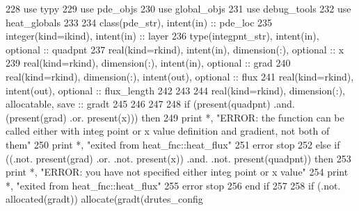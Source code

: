 \begin{DoxyCode}
228       \textcolor{keywordtype}{use }typy
229       \textcolor{keywordtype}{use }pde_objs
230       \textcolor{keywordtype}{use }global_objs
231       \textcolor{keywordtype}{use }debug_tools
232       \textcolor{keywordtype}{use }heat_globals
233        
234       \textcolor{keywordtype}{class}(pde_str), \textcolor{keywordtype}{intent(in)} :: pde\_loc
235       \textcolor{keywordtype}{integer(kind=ikind)}, \textcolor{keywordtype}{intent(in)}                          :: layer
236       \textcolor{keywordtype}{type}(integpnt_str), \textcolor{keywordtype}{intent(in)}, \textcolor{keywordtype}{optional} :: quadpnt    
237       \textcolor{keywordtype}{real(kind=rkind)}, \textcolor{keywordtype}{intent(in)}, \textcolor{keywordtype}{dimension(:)}, \textcolor{keywordtype}{optional}              \textcolor{comment}{     :: x}
239       \textcolor{keywordtype}{real(kind=rkind)}, \textcolor{keywordtype}{dimension(:)}, \textcolor{keywordtype}{intent(in)}, \textcolor{keywordtype}{optional}     :: grad
240       \textcolor{keywordtype}{real(kind=rkind)}, \textcolor{keywordtype}{dimension(:)}, \textcolor{keywordtype}{intent(out)}, \textcolor{keywordtype}{optional}    :: flux
241       \textcolor{keywordtype}{real(kind=rkind)}, \textcolor{keywordtype}{intent(out)}, \textcolor{keywordtype}{optional}                  :: flux\_length
242     
243 
244       \textcolor{keywordtype}{real(kind=rkind)}, \textcolor{keywordtype}{dimension(:)}, \textcolor{keywordtype}{allocatable}, \textcolor{keywordtype}{save} :: gradt
245 
246       
247       
248       \textcolor{keywordflow}{if} (\textcolor{keyword}{present}(quadpnt) .and. (\textcolor{keyword}{present}(grad) .or. \textcolor{keyword}{present}(x))) \textcolor{keywordflow}{then}
249         print *, \textcolor{stringliteral}{"ERROR: the function can be called either with integ point or x value definition and
       gradient, not both of them"}
250         print *, \textcolor{stringliteral}{"exited from heat\_fnc::heat\_flux"}
251         error stop
252       \textcolor{keywordflow}{else} \textcolor{keywordflow}{if} ((.not. \textcolor{keyword}{present}(grad) .or. .not. \textcolor{keyword}{present}(x)) .and. .not. \textcolor{keyword}{present}\textcolor{comment}{(quadpnt)) }\textcolor{keywordflow}{then}
253         print *, \textcolor{stringliteral}{"ERROR: you have not specified either integ point or x value"}
254         print *, \textcolor{stringliteral}{"exited from heat\_fnc::heat\_flux"}
255         error stop
256 \textcolor{keywordflow}{      end if}   
257 
258       \textcolor{keywordflow}{if} (.not. \textcolor{keyword}{allocated}(gradt)) \textcolor{keyword}{allocate}(gradt(drutes_config%

\end{DoxyCode}
